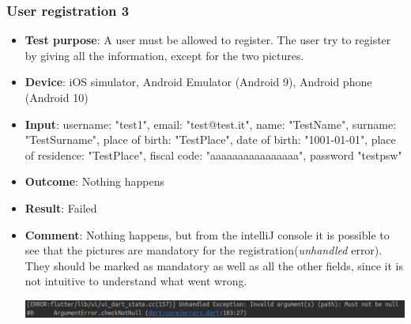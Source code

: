 \documentclass[../ATD.tex]{subfiles}
\begin{document}
    \subsubsection{User registration 3}\label{subsubsec:user-registration-3}
    \begin{itemize}
        \item \textbf{Test purpose}: A user must be allowed to register.
        The user try to register by giving all the information, except for the two pictures.
        \item \textbf{Device}: iOS simulator, Android Emulator (Android 9), Android phone (Android 10)
        \item \textbf{Input}: username: "test1", email: "test@test.it", name: "TestName", surname: "TestSurname", place of birth: "TestPlace", date of birth: "1001-01-01", place of residence: "TestPlace", fiscal code: "aaaaaaaaaaaaaaaa", password "testpsw"
        \item \textbf{Outcome}: Nothing happens
        \item \textbf{Result}: Failed
        \item \textbf{Comment}: Nothing happens, but from the intelliJ console it is possible to see that the pictures are mandatory for the registration(\textit{unhandled} error).
        They should be marked as mandatory as well as all the other fields, since it is not intuitive to understand what went wrong.

        \includegraphics[scale = 0.4]{assets/noPicError.png}
    \end{itemize}
\end{document}
